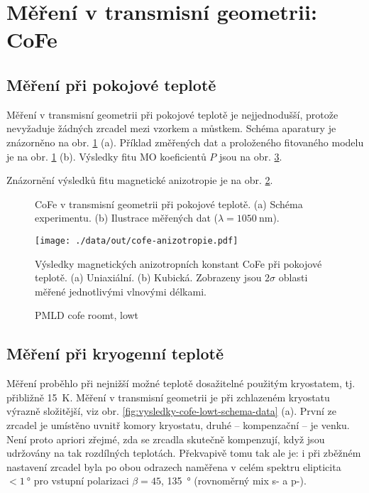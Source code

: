 \section{Měření v transmisní geometrii: CoFe}
\label{chap:vysledky-cofe}

\subsection{Měření při pokojové teplotě}
\label{chap:vysledky-cofe-roomt}

Měření v transmisní geometrii při pokojové teplotě je nejjednodušší, protože nevyžaduje žádných zrcadel mezi vzorkem a můstkem.
Schéma aparatury je znázorněno na obr. \ref{fig:vysledky-cofe-schema-data} (a).
Příklad změřených dat a proloženého fitovaného modelu je na obr. \ref{fig:vysledky-cofe-schema-data} (b).
Výsledky fitu MO koeficientů $P$ jsou na obr. \ref{fig:vysledky-cofe-PMLD}.

Znázornění výsledků fitu magnetické anizotropie je na obr. \ref{fig:vysledky-cofe-roomt-anizotropie}.

\begin{figure}[htbp]
    \centering
    \missingfigure{}
    \caption{CoFe v transmisní geometrii při pokojové teplotě. (a) Schéma experimentu. (b) Ilustrace měřených dat ($\lambda=\SI{1050}{\nano\meter}$).}
    \label{fig:vysledky-cofe-schema-data}
\end{figure}

\begin{figure}[htbp]
    \centering
    \texttt{[image: ./data/out/cofe-anizotropie.pdf]}
    \caption{Výsledky magnetických anizotropních konstant CoFe při pokojové teplotě. (a) Uniaxiální. (b) Kubická. Zobrazeny jsou $2\sigma$ oblasti měřené jednotlivými vlnovými délkami.}
    \label{fig:vysledky-cofe-roomt-anizotropie}
\end{figure}

\begin{figure}[htbp]
    \centering
    \missingfigure{}
    \caption{PMLD cofe roomt, lowt}
    \label{fig:vysledky-cofe-PMLD}
\end{figure}

\subsection{Měření při kryogenní teplotě}
\label{chap:vysledky-cofe-lowt}

Měření proběhlo při nejnižší možné teplotě dosažitelné použitým kryostatem, tj. přibližně \SI{15}{\kelvin}.
Měření v transmisní geometrii je při zchlazeném kryostatu výrazně složitější, viz obr. \ref{fig:vysledky-cofe-lowt-schema-data} (a).
První ze zrcadel je umístěno uvnitř komory kryostatu, druhé -- kompenzační -- je venku.
Není proto apriori zřejmé, zda se zrcadla skutečně kompenzují, když jsou udržovány na tak rozdílných teplotách.
Překvapivě tomu tak ale je: i při zběžném nastavení zrcadel byla po obou odrazech naměřena v celém spektru elipticita $<\SI{1}{\degree}$ pro vstupní polarizaci $\beta=45$, \SI{135}{\degree} (rovnoměrný mix s- a p-).

